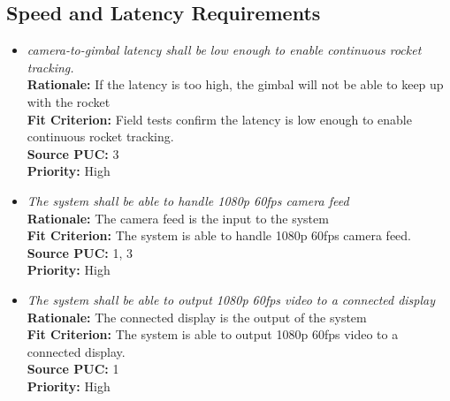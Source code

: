\documentclass[12pt]{article}
\begin{document}
\subsection{Speed and Latency Requirements}
\begin{itemize}[leftmargin=*]
  \item[SLR-1] \emph{camera-to-gimbal latency shall be low enough to enable continuous
          rocket tracking.}\\[2mm]
        \textbf{Rationale:} If the latency is too high, the gimbal will not be able to keep up with the rocket\\
        \textbf{Fit Criterion:} Field tests confirm the latency is low enough to enable continuous rocket tracking.\\
        \textbf{Source PUC:} 3 \\
        \textbf{Priority:} High

  \item[SLR-2] \emph{The system shall be able to handle 1080p 60fps camera feed}\\[2mm]
        \textbf{Rationale:} The camera feed is the input to the system\\
        \textbf{Fit Criterion:} The system is able to handle 1080p 60fps camera feed.\\
        \textbf{Source PUC:} 1, 3 \\
        \textbf{Priority:} High

  \item[SLR-3] \emph{The system shall be able to output 1080p 60fps video to a
          connected display}\\[2mm]
        \textbf{Rationale:} The connected display is the output of the system\\
        \textbf{Fit Criterion:} The system is able to output 1080p 60fps video to a connected display.\\
        \textbf{Source PUC:} 1 \\
        \textbf{Priority:} High
\end{itemize}
\end{document}
